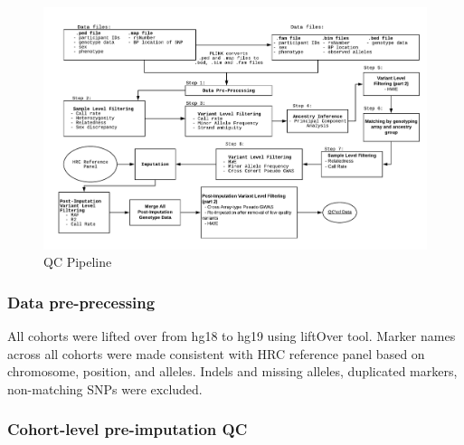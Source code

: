\documentclass[12pt]{amsart}
\begin{document}
\begin{figure}
    \centering
    \includegraphics[width=\textwidth]{qc/pipeline.pdf}
    \caption{QC Pipeline}
    \label{fig:qc_pipeline}
\end{figure}


\subsubsection{Data pre-precessing}
All cohorts were lifted over from hg18 to hg19 using liftOver tool. Marker names across all cohorts were made consistent with HRC reference panel based on chromosome, position, and alleles. Indels and missing alleles, duplicated markers, non-matching SNPs were excluded. 

\subsubsection{Cohort-level pre-imputation QC}
\end{document}
